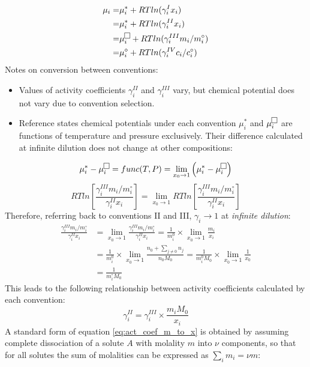 \documentclass[onecolumn]{article}
\begin{document}
\begin{equation}
\begin{aligned}
\mu_i = & \mu_i^{*} + RTln(\gamma_i^{I} x_i) \\
	= 	& \mu_i^{*} + RTln(\gamma_i^{II} x_i) \\
	=	& \mu_i^{\fbox{}} + RTln(\gamma_i^{III} m_i/m_i^{\circ}) \\
	= 	& \mu_i^{\diamond} + RTln(\gamma_i^{IV} c_i/c_i^{\circ})
\end{aligned}
\end{equation}
Notes on conversion between conventions: 
\begin{itemize}
\item Values of activity coefficients $\gamma_i^{II}$ and $\gamma_i^{III}$ vary, but chemical potential does not vary due to convention selection.
\item Reference states chemical potentials under each convention $\mu_i^{*}$ and $\mu_i^{\fbox{}}$  are functions of temperature and pressure exclusively. Their difference calculated at infinite dilution does not change at other compositions:
\end{itemize}
\[
\mu_i^{*} - \mu_i^{\fbox{}}  =  func(T,P) =  \lim_{x_0 \to 1} \left( \mu_i^{*} - \mu_i^{\fbox{}}\right) 
\]
\[
RTln\left[ \frac{\gamma_i^{III} m_i/m_i^{\circ}}{\gamma_i^{II} x_i}\right] = \lim_{x_0 \to 1} RTln\left[ \frac{\gamma_i^{III} m_i/m_i^{\circ}}{\gamma_i^{II} x_i}\right] 
\]
Therefore, referring back to conventions II and III, $\gamma_i \rightarrow 1$ at \textit{infinite dilution}:
\[
\begin{aligned}
\frac{\gamma_i^{III} m_i/m_i^{\circ}}{\gamma_i^{II} x_i} & = \lim_{x_0 \to 1} \frac{\gamma_i^{III} m_i/m_i^{\circ}}{\gamma_i^{II} x_i} = \frac{1}{m_i^0} \times \lim_{x_0 \to 1} \frac{m_i}{x_i} \\
& = \frac{1}{m_i^0} \times \lim_{x_0 \to 1} \frac{n_0+\sum_{j \neq 0}n_j}{n_0 M_0} = \frac{1}{m_i^0 M_0} \times \lim_{x_0 \to 1} \frac{1}{x_0} \\
& = \frac{1}{m_i^\circ M_0}
\end{aligned}
\]
This leads to the following relationship between activity coefficients calculated by each convention:
\begin{equation}
\label{eq:act_coef_m_to_x}
\gamma_i^{II} = \gamma_i^{III} \times \frac{m_i M_0}{x_i}
\end{equation}
A standard form of equation \ref{eq:act_coef_m_to_x} is obtained by assuming complete dissociation of a solute $A$ with molality $m$ into $\nu$ components, so that for all solutes the sum of molalities can be expressed as $\sum_{i}m_i = \nu m $:
\end{document}
